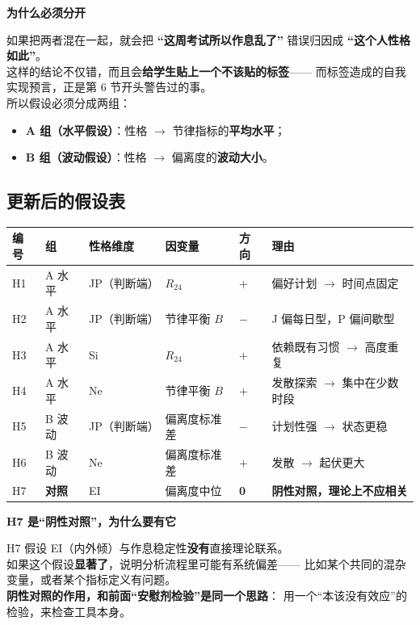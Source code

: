 \documentclass[UTF8,a4paper,11pt]{ctexart}
\newenvironment{explainbox}[1]
{\begin{center}\begin{minipage}{0.94\textwidth}\colorbox{boxbg}{\parbox{0.92\textwidth}{\textbf{#1}\par\vspace{2pt}}}}
{\end{minipage}\end{center}}
\begin{document}
\begin{explainbox}{为什么必须分开}
如果把两者混在一起，就会把
\textbf{“这周考试所以作息乱了”}
错误归因成
\textbf{“这个人性格如此”}。\\[6pt]
这样的结论不仅错，而且会\textbf{给学生贴上一个不该贴的标签}——
而标签造成的自我实现预言，正是第 6 节开头警告过的事。\\[6pt]
所以假设必须分成两组：
\begin{itemize}[leftmargin=1.4em,itemsep=1pt]
\item \textbf{A 组（水平假设）}：性格 $\to$ 节律指标的\textbf{平均水平}；
\item \textbf{B 组（波动假设）}：性格 $\to$ 偏离度的\textbf{波动大小}。
\end{itemize}
\end{explainbox}

\subsection{更新后的假设表}

\begin{longtable}{@{}p{1.0cm}p{2.4cm}p{2.8cm}p{3.6cm}p{1.4cm}p{2.6cm}@{}}
\toprule
\textbf{编号} & \textbf{组} & \textbf{性格维度} & \textbf{因变量} & \textbf{方向} & \textbf{理由} \\
\midrule
H1 & A 水平 & JP（判断端） & $R_{24}$ & $+$ & 偏好计划 $\to$ 时间点固定 \\
H2 & A 水平 & JP（判断端） & 节律平衡 $B$ & $-$ & J 偏每日型，P 偏间歇型 \\
H3 & A 水平 & Si & $R_{24}$ & $+$ & 依赖既有习惯 $\to$ 高度重复 \\
H4 & A 水平 & Ne & 节律平衡 $B$ & $+$ & 发散探索 $\to$ 集中在少数时段 \\
H5 & B 波动 & JP（判断端） & 偏离度标准差 & $-$ & 计划性强 $\to$ 状态更稳 \\
H6 & B 波动 & Ne & 偏离度标准差 & $+$ & 发散 $\to$ 起伏更大 \\
H7 & \textbf{对照} & EI & 偏离度中位 & \textbf{0} & \textbf{阴性对照，理论上不应相关} \\
\bottomrule
\end{longtable}

\begin{explainbox}{H7 是“阴性对照”，为什么要有它}
H7 假设 EI（内外倾）与作息稳定性\textbf{没有}直接理论联系。\\
如果这个假设\textbf{显著了}，说明分析流程里可能有系统偏差——
比如某个共同的混杂变量，或者某个指标定义有问题。\\[4pt]
\textbf{阴性对照的作用，和前面“安慰剂检验”是同一个思路}：
用一个“本该没有效应”的检验，来检查工具本身。
\end{explainbox}
\end{document}
